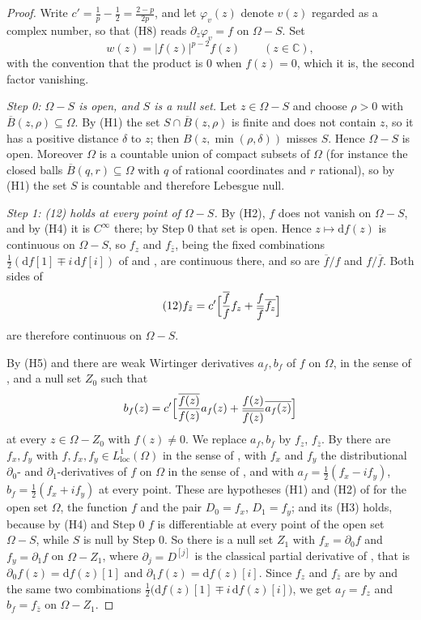 \begin{proof}
Write $c'=\tfrac1p-\tfrac12=\tfrac{2-p}{2p}$, and let
$\varphi_v(z)$ denote $v(z)$ regarded as a complex number, so that (H8) reads
$\partial_z\varphi_v=f$ on $\Omega-S$.  Set
\[
  w(z)=|f(z)|^{p-2}f(z)\qquad(z\in\mathbb{C}),
\]
with the convention that the product is $0$ when $f(z)=0$, which it is, the
second factor vanishing.

\emph{Step 0: $\Omega-S$ is open, and $S$ is a null set.}  Let $z\in\Omega-S$ and
choose $\rho>0$ with $\overline{B}(z,\rho)\subseteq\Omega$.  By (H1) the set
$S\cap\overline{B}(z,\rho)$ is finite and does not contain $z$, so it has a
positive distance $\delta$ to $z$; then $B(z,\min(\rho,\delta))$ misses $S$.
Hence $\Omega-S$ is open.  Moreover $\Omega$ is a countable union of compact
subsets of $\Omega$ (for instance the closed balls $\overline{B}(q,r)\subseteq
\Omega$ with $q$ of rational coordinates and $r$ rational), so by (H1) the set
$S$ is countable and therefore Lebesgue null.

\emph{Step 1: (12) holds at every point of $\Omega-S$.}  By (H2), $f$ does not
vanish on $\Omega-S$, and by (H4) it is $C^\infty$ there; by Step 0 that set is
open.  Hence $z\mapsto\mathrm{d}f(z)$ is continuous on $\Omega-S$, so $f_z$ and
$f_{\bar z}$, being the fixed combinations
$\tfrac12(\mathrm{d}f[1]\mp i\,\mathrm{d}f[i])$ of  and
, are continuous there, and so are
$\overline{f}/f$ and $f/\overline{f}$.  Both sides of
\begin{equation}\tag{12}
  f_{\bar z}=c'\Bigl[\frac{\overline{f}}{f}f_z+\frac{f}{\overline{f}}
    \overline{f_z}\Bigr]
\end{equation}
are therefore continuous on $\Omega-S$.

By (H5) and  there are weak Wirtinger derivatives $a_f,b_f$
of $f$ on $\Omega$, in the sense of , and a null set
$Z_0$ such that
\[
  b_f(z)=c'\Bigl[\frac{\overline{f(z)}}{f(z)}a_f(z)
    +\frac{f(z)}{\overline{f(z)}}\overline{a_f(z)}\Bigr]
\]
at every $z\in\Omega-Z_0$ with $f(z)\neq0$.  We replace $a_f,b_f$ by $f_z$,
$f_{\bar z}$.  By  there are $f_x,f_y$ with
$f,f_x,f_y\in L^1_{\mathrm{loc}}(\Omega)$ in the sense of ,
with $f_x$ and $f_y$ the distributional $\partial_0$- and
$\partial_1$-derivatives of $f$ on $\Omega$ in the sense of
, and with $a_f=\tfrac12(f_x-if_y)$,
$b_f=\tfrac12(f_x+if_y)$ at every point.  These are hypotheses (H1) and (H2) of
 for the open set $\Omega$, the function $f$ and
the pair $D_0=f_x$, $D_1=f_y$; and its (H3) holds, because by (H4) and Step 0
$f$ is differentiable at every point of the open set $\Omega-S$, while $S$ is
null by Step 0.  So there is a null set $Z_1$ with $f_x=\partial_0f$ and
$f_y=\partial_1f$ on $\Omega-Z_1$, where $\partial_j=D^{[j]}$ is the classical
partial derivative of , that is
$\partial_0f(z)=\mathrm{d}f(z)[1]$ and $\partial_1f(z)=\mathrm{d}f(z)[i]$.  Since
$f_z$ and $f_{\bar z}$ are by  and  the same two
combinations $\tfrac12\bigl(\mathrm{d}f(z)[1]\mp i\,\mathrm{d}f(z)[i]\bigr)$,
we get $a_f=f_z$ and $b_f=f_{\bar z}$ on $\Omega-Z_1$.


\end{proof}
